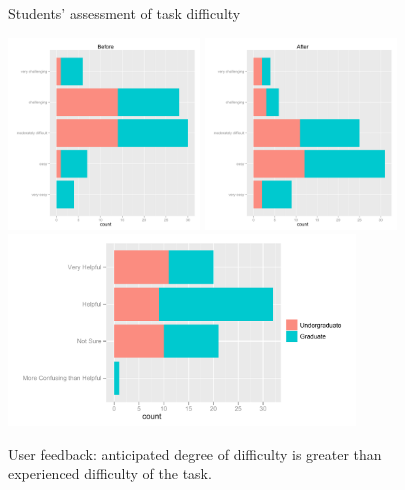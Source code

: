 \documentclass[11pt]{tise_style}
\begin{document}
\begin{figure}[htbp] %
   \centering
Students' assessment of task difficulty 

   \includegraphics[height=2in,  keepaspectratio=true]{fb-before.pdf} 
   \includegraphics[height=2in,  keepaspectratio=true]{fb-after.pdf} 
   \includegraphics[height=2in,  keepaspectratio=true]{fb-legend.pdf} 
   \caption{User feedback: anticipated degree of difficulty is greater than experienced difficulty of the task.}
   \label{fb-before-after}
\end{figure}

\end{document}
